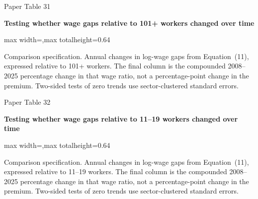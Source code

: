 \begin{frame}{Paper Table 31}
\begin{minipage}{\textwidth}\small\textbf{Testing whether wage gaps relative to 101+ workers changed over time}\end{minipage}\par\vspace{0.15cm}
\centering\begingroup\fontsize{8.5}{10}\selectfont
\setlength{\tabcolsep}{4pt}\renewcommand{\arraystretch}{1.06}
\begin{adjustbox}{max width=\textwidth,max totalheight=0.64\textheight}

\end{adjustbox}\endgroup\par\vspace{0.10cm}
{\fontsize{6.5}{7.5}\selectfont\raggedright Comparison specification. Annual changes in log-wage gaps from Equation~(11), expressed relative to 101+ workers. The final column is the compounded 2008--2025 percentage change in that wage ratio, not a percentage-point change in the premium. Two-sided tests of zero trends use sector-clustered standard errors.\par}
\end{frame}

\begin{frame}{Paper Table 32}
\begin{minipage}{\textwidth}\small\textbf{Testing whether wage gaps relative to 11--19 workers changed over time}\end{minipage}\par\vspace{0.15cm}
\centering\begingroup\fontsize{8.5}{10}\selectfont
\setlength{\tabcolsep}{4pt}\renewcommand{\arraystretch}{1.06}
\begin{adjustbox}{max width=\textwidth,max totalheight=0.64\textheight}

\end{adjustbox}\endgroup\par\vspace{0.10cm}
{\fontsize{6.5}{7.5}\selectfont\raggedright Comparison specification. Annual changes in log-wage gaps from Equation~(11), expressed relative to 11--19 workers. The final column is the compounded 2008--2025 percentage change in that wage ratio, not a percentage-point change in the premium. Two-sided tests of zero trends use sector-clustered standard errors.\par}
\end{frame}

